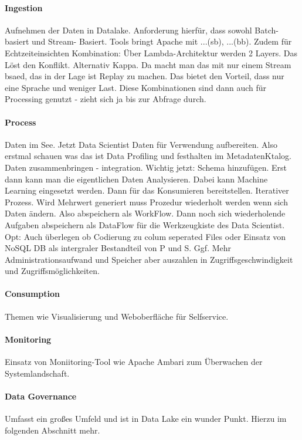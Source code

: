 \documentclass[twoside,twocolumn]{article}
\begin{document}
\paragraph{Ingestion}
		Aufnehmen der Daten in Datalake. Anforderung hierfür, dass sowohl Batch-basiert und Stream- Basiert. Tools bringt Apache mit ...(sb), ...(bb).\cite{src8}
		Zudem für Echtzeiteinsichten Kombination: Über Lambda-Architektur werden 2 Layers. Das Löst den Konflikt. \cite{src10} Alternativ Kappa. Da macht man das mit nur einem Stream bsaed, das in der Lage ist Replay zu machen. Das bietet den Vorteil, dass nur eine Sprache und weniger Last.\cite{src11} Diese Kombinationen sind dann auch für Processing genutzt - zieht sich ja bis zur Abfrage durch.
\paragraph{Process}
		Daten im See. Jetzt Data Scientist Daten für Verwendung aufbereiten. Also erstmal schauen was das ist Data Profiling und festhalten im MetadatenKtalog. Daten zusammenbringen - integration. Wichtig jetzt: Schema hinzufügen. Erst dann kann man die eigentlichen Daten Analysieren. Dabei kann Machine Learning eingesetzt werden. Dann für das Konsumieren bereitstellen. Iterativer Prozess. 
		Wird Mehrwert generiert muss Prozedur wiederholt werden wenn sich Daten ändern. Also abspeichern als WorkFlow. Dann noch sich wiederholende Aufgaben abspeichern als DataFlow für die Werkzeugkiste des Data Scientist. Opt: Auch überlegen ob Codierung zu colum seperated Files oder Einsatz von NoSQL DB als intergraler Bestandteil von P und S. Ggf. Mehr Administrationsaufwand und Speicher aber auszahlen in Zugriffsgeschwindigkeit und Zugriffsmöglichkeiten.\cite{src8}\cite{src12}
\paragraph{Consumption}
		Themen wie Visualisierung und Weboberfläche für Selfservice.\cite{src8}\cite{src12}
\paragraph{Monitoring}
		Einsatz von Moniitoring-Tool wie Apache Ambari zum Überwachen der Systemlandschaft.\cite{src8}
\paragraph{Data Governance}
		Umfasst ein großes Umfeld und ist in Data Lake ein wunder Punkt. Hierzu im folgenden Abschnitt mehr.
\end{document}
